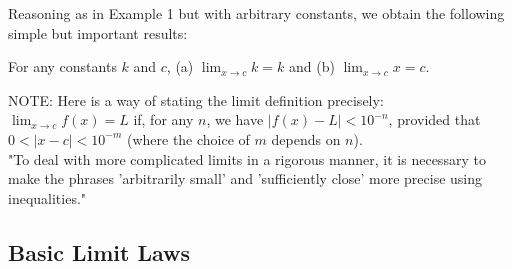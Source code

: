 \documentclass{article}
\begin{document}
Reasoning as in Example 1 but with arbitrary constants, we obtain the following simple but important results:
\begin{center}For any constants $k$ and $c$, (a) $\lim_{x \to c}k = k$ and (b) $\lim_{x \to c}x = c$.\end{center}

NOTE: Here is a way of stating the limit definition precisely:\\
$\lim_{x \to c}f(x) = L$ if, for any $n$, we have $\left|f(x) -  L\right| < 10^{-n}$, provided that $0 < \left|x - c\right| < 10^{-m}$ (where the choice of $m$ depends on $n$).\\

"To deal with more complicated limits in a rigorous manner, it is necessary to make the phrases 'arbitrarily small' and 'sufficiently close' more precise using inequalities."

\subsection*{Basic Limit Laws}
\end{document}
